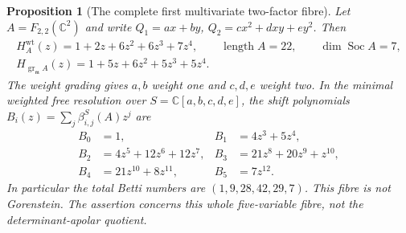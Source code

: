 \documentclass[11pt,reqno]{amsart}
\numberwithin{equation}{section}
\newtheorem{proposition}[theorem]{Proposition}
\theoremstyle{definition}\newtheorem{definition}[theorem]{Definition}
\theoremstyle{remark}\newtheorem{remark}[theorem]{Remark}
\newcommand{\C}{\mathbb C}\newcommand{\Q}{\mathbb Q}
\DeclareMathOperator{\gr}{gr}\DeclareMathOperator{\Gal}{Gal}
\DeclareMathOperator{\length}{length}
\begin{document}
\begin{proposition}[The complete first multivariate two-factor fibre]
\label{prop:F22-v154}
Let $A=F_{2,2}(\C^2)$ and write
$Q_1=ax+by$, $Q_2=cx^2+dxy+ey^2$.
Then
\begin{gather}\label{eq:F22-hilbert-v154}
 H_A^{\mathrm{wt}}(z)=1+2z+6z^2+6z^3+7z^4,\qquad
 \length A=22,\qquad\dim\operatorname{Soc}A=7,\\
 \label{eq:F22-local-hilbert-v154}
 H_{\gr_{\mathfrak m}A}(z)=1+5z+6z^2+5z^3+5z^4.
\end{gather}
The weight grading gives $a,b$ weight one and $c,d,e$ weight two.
In the minimal weighted free resolution over
$S=\C[a,b,c,d,e]$, the shift polynomials
$B_i(z)=\sum_j\beta_{i,j}^S(A)z^j$ are
\begin{align*}
 B_0&=1,& B_1&=4z^3+5z^4,\\
 B_2&=4z^5+12z^6+12z^7,&
 B_3&=21z^8+20z^9+z^{10},\\
 B_4&=21z^{10}+8z^{11},&B_5&=7z^{12}.
\end{align*}
In particular the total Betti numbers are $(1,9,28,42,29,7)$.
This fibre is not Gorenstein. The assertion concerns this whole
five-variable fibre, not the determinant-apolar quotient.
\end{proposition}
\end{document}
